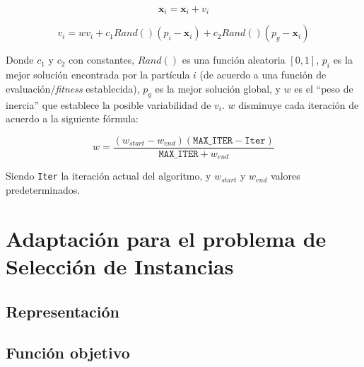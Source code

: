 $$\textbf{x}_i = \textbf{x}_i + v_i$$

$$v_i = w v_i + c_1 Rand() (p_i - \textbf{x}_i) +  c_2 Rand() (p_g - \textbf{x}_i)$$

Donde $c_1$ y $c_2$ con constantes, $Rand()$ es una función aleatoria $[0,1]$, $p_i$ es la mejor solución encontrada por la partícula $i$ (de acuerdo a una función de evaluación/\emph{fitness} establecida), $p_g$ es la mejor solución global, y $w$ es el ``peso de inercia'' que establece la posible variabilidad de $v_i$. $w$ disminuye cada iteración de acuerdo a la siguiente fórmula:

$$w = \frac{(w_{start} - w_{end})(\texttt{MAX\_ITER} - \texttt{Iter})}{\texttt{MAX\_ITER} + w_{end}}$$

Siendo \texttt{Iter} la iteración actual del algoritmo, y $w_{start}$ y $w_{end}$ valores predeterminados.

\section{Adaptación para el problema de Selección de Instancias}

\subsection{Representación}

\subsection{Función objetivo}
